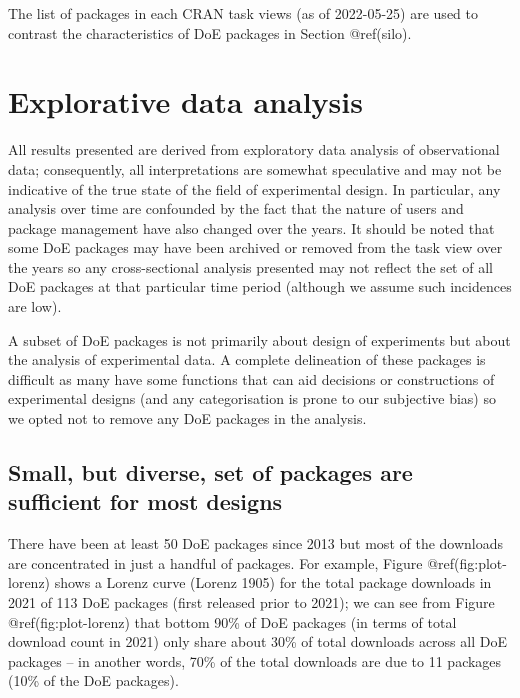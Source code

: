 \documentclass{article}
\begin{document}
The list of packages in each CRAN task views (as of 2022-05-25) are used
to contrast the characteristics of DoE packages in Section @ref(silo).

\hypertarget{eda}{%
\section{Explorative data analysis}\label{eda}}

All results presented are derived from exploratory data analysis of
observational data; consequently, all interpretations are somewhat
speculative and may not be indicative of the true state of the field of
experimental design. In particular, any analysis over time are
confounded by the fact that the nature of users and package management
have also changed over the years. It should be noted that some DoE
packages may have been archived or removed from the task view over the
years so any cross-sectional analysis presented may not reflect the set
of all DoE packages at that particular time period (although we assume
such incidences are low).

A subset of DoE packages is not primarily about design of experiments
but about the analysis of experimental data. A complete delineation of
these packages is difficult as many have some functions that can aid
decisions or constructions of experimental designs (and any
categorisation is prone to our subjective bias) so we opted not to
remove any DoE packages in the analysis.

\hypertarget{popular}{%
\subsection{Small, but diverse, set of packages are sufficient for most
designs}\label{popular}}

There have been at least 50 DoE packages since 2013 but most of the
downloads are concentrated in just a handful of packages. For example,
Figure @ref(fig:plot-lorenz) shows a Lorenz curve (Lorenz 1905) for the
total package downloads in 2021 of 113 DoE packages (first released
prior to 2021); we can see from Figure @ref(fig:plot-lorenz) that bottom
90\% of DoE packages (in terms of total download count in 2021) only
share about 30\% of total downloads across all DoE packages -- in
another words, 70\% of the total downloads are due to 11 packages (10\%
of the DoE packages).
\end{document}

